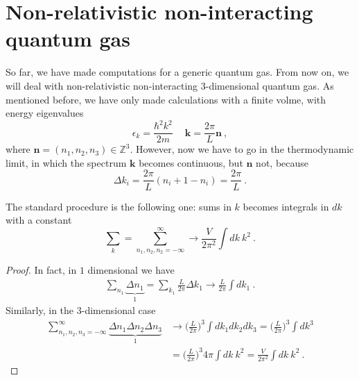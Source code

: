 \section{Non-relativistic non-interacting quantum gas}

    So far, we have made computations for a generic quantum gas. From now on, we will deal with non-relativistic non-interacting $3$-dimensional quantum gas. As mentioned before, we have only made calculations with a finite volme, with energy eigenvalues 
    \begin{equation*}
        \epsilon_k = \frac{\hbar^2 k^2}{2m} ~ \quad \mathbf k = \frac{2\pi}{L} \mathbf n ~,
    \end{equation*}
    where $\mathbf n = (n_1, n_2, n_3) \in \mathbb Z^3$. However, now we have to go in the thermodynamic limit, in which the spectrum $\mathbf k$ becomes continuous, but $\mathbf n$ not, because
    \begin{equation*}
        \Delta k_i = \frac{2\pi}{L} (n_i + 1 - n_i) = \frac{2\pi}{L} ~.
    \end{equation*}

    The standard procedure is the following one: sums in $k$ becomes integrals in $dk$ with a constant
    \begin{equation}\label{tdlim}
        \sum_k = \sum_{n_1, n_2, n_2 = -\infty}^\infty \rightarrow \frac{V}{2\pi^2} \int dk~k^2 ~.
    \end{equation}
    \begin{proof}
        In fact, in $1$ dimensional we have 
        \begin{equation*}
        \begin{aligned}
            \sum_{n_1} \underbrace{\Delta n_1}_1 = \sum_{k_1} \frac{L}{2\pi} \Delta k_1 \rightarrow \frac{L}{2\pi} \int dk_1 ~.
        \end{aligned}
        \end{equation*}
        Similarly, in the $3$-dimensional case
        \begin{equation*}
        \begin{aligned}
            \sum_{n_1, n_2, n_3=- \infty}^\infty \underbrace{\Delta n_1 \Delta n_2 \Delta n_3}_1 & \rightarrow \Big ( \frac{L}{2\pi} \Big)^3 \int dk_1 dk_2 dk_3 = \Big ( \frac{L}{2\pi} \Big)^3 \int dk^3 \\ & = \Big ( \frac{L}{2\pi} \Big)^3 4 \pi \int dk ~ k^2 = \frac{V}{2\pi^2} \int dk~k^2 ~. 
        \end{aligned}
        \end{equation*}
    \end{proof}

